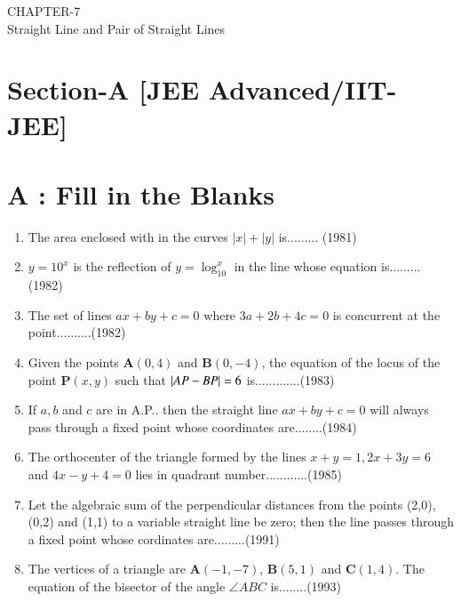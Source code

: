 \documentclass[12pt]{article}
\let\vec\mathbf
\begin{document}
\begin{center}
\textbf\large{CHAPTER-7 \\ Straight Line and Pair of Straight Lines}

\end{center}


\section*{Section-A    [JEE Advanced/IIT-JEE]}
\section*{A    :  Fill in the Blanks}
\fi
\begin{enumerate}

\item  The area enclosed with in the curves $|x|+|y|$ is.........  (1981) \\
\item  $y=10^x$ is the reflection of $y=\log_{10}^x $ in the line whose equation is.........(1982)\\
\item The set of lines $ax+by+c=0$ where $3a+2b+4c=0$ is concurrent at the point..........(1982)\\
\item  Given the points $\vec{A}(0,4)$ and $\vec{B}(0,-4)$, the equation of the locus of the point $\vec{P}(x,y)$ such that $\left\vert AP-BP\right\vert=6$ is.............(1983)\\
\item  If $a,b$ and $c$ are in A.P.. then the straight line $ax+by+c=0$ will always pass through a fixed point whose coordinates are........(1984)\\
\item  The orthocenter of the triangle formed by the lines $x+y=1, 2x+3y=6$  and  $4x-y+4=0$ lies in quadrant number............(1985)\\
\item Let the algebraic sum of the perpendicular distances from the points (2,0), (0,2) and (1,1) to a variable straight line be zero; then the line passes through a fixed point whose cordinates are.........(1991)\\
\item The vertices of a triangle are $\vec{A}(-1,-7)$, $\vec{B}(5,1)$ and $\vec{C}(1,4)$. The equation of the bisector of the angle $\angle{ABC}$ is........(1993)
\iffalse
\end{enumerate}
\end{document}
